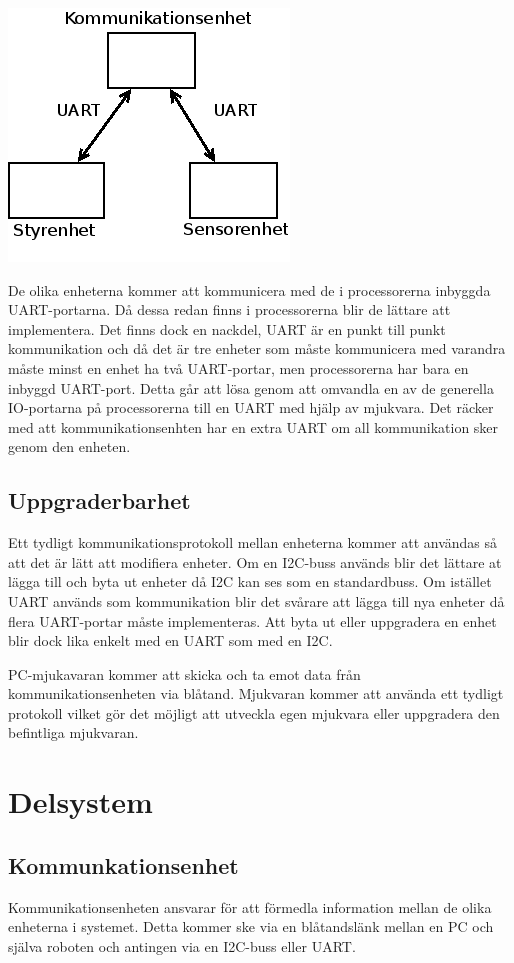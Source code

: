 \documentclass[a4paper,12pt]{article}
\begin{document}
\begin{center}
\includegraphics[scale=0.7]{delsystem_uart.png}
\end{center}
De olika enheterna kommer att kommunicera med de i processorerna inbyggda UART-portarna. 
Då dessa redan finns i processorerna blir de lättare att implementera. Det finns dock en nackdel, UART är en 
punkt till punkt kommunikation och då det är tre enheter som måste kommunicera med varandra måste minst en enhet
ha två UART-portar, men processorerna har bara en inbyggd UART-port. Detta går att lösa genom att omvandla en av de generella 
IO-portarna på processorerna till en UART med hjälp av mjukvara. 
Det räcker med att kommunikationsenhten har en extra UART om all kommunikation sker genom den enheten.

\subsection{Uppgraderbarhet}
Ett tydligt kommunikationsprotokoll mellan enheterna kommer att användas så att det är lätt att modifiera enheter.
Om en I2C-buss används blir det lättare at lägga till och byta ut enheter då I2C kan ses som en standardbuss.
Om istället UART används som kommunikation blir det svårare att lägga till nya enheter då flera UART-portar måste implementeras.
Att byta ut eller uppgradera en enhet blir dock lika enkelt med en UART som med en I2C.

PC-mjukavaran kommer att skicka och ta emot data från kommunikationsenheten via blåtand.
Mjukvaran kommer att använda ett tydligt protokoll vilket gör det möjligt att utveckla egen mjukvara eller uppgradera den befintliga mjukvaran.
\section{Delsystem}

\subsection{Kommunkationsenhet}
Kommunikationsenheten ansvarar för att förmedla information mellan de olika
enheterna i systemet. Detta kommer ske via en blåtandslänk mellan en PC och
själva roboten och antingen via en I2C-buss eller UART.
\end{document}
